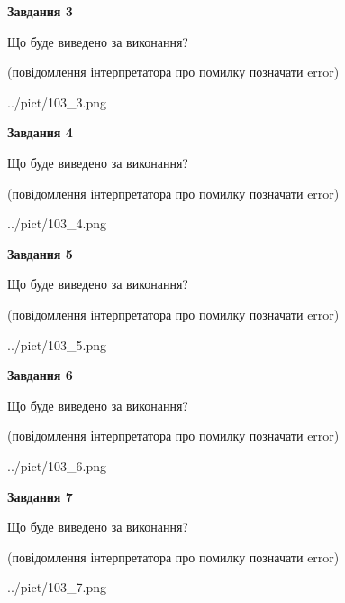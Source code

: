 \documentclass[12pt, ukrainian]{article}
\begin{document}
{\begin {large}
{\begin {center}\textbf{Завдання 3}\end {center}}\par
Що буде виведено за виконання?\par
 (повідомлення інтерпретатора про помилку позначати error)\par
\begin{center}
	{../pict/103_3.png}
\end{center}
\newpage

{\begin {center}\textbf{Завдання 4}\end {center}}\par
Що буде виведено за виконання?\par
 (повідомлення інтерпретатора про помилку позначати error)\par
\begin{center}
	{../pict/103_4.png}
\end{center}
\newpage

{\begin {center}\textbf{Завдання 5}\end {center}}\par
Що буде виведено за виконання?\par
 (повідомлення інтерпретатора про помилку позначати error)\par
\begin{center}
	{../pict/103_5.png}
\end{center}
\newpage

{\begin {center}\textbf{Завдання 6}\end {center}}\par
Що буде виведено за виконання?\par
 (повідомлення інтерпретатора про помилку позначати error)\par
\begin{center}
	{../pict/103_6.png}
\end{center}
\newpage

{\begin {center}\textbf{Завдання 7}\end {center}}\par
Що буде виведено за виконання?\par
 (повідомлення інтерпретатора про помилку позначати error)\par
\begin{center}
	{../pict/103_7.png}
\end{center}
\newpage


\end{large}}
\end{document}
